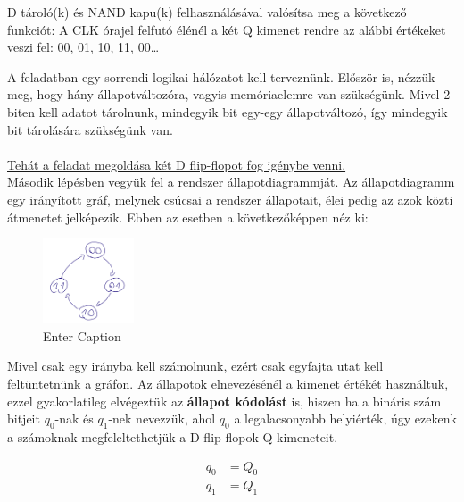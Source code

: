 \begin{example2}

D tároló(k) és NAND kapu(k) felhasználásával valósítsa meg a következő funkciót:
A CLK órajel felfutó élénél a két Q kimenet rendre az alábbi értékeket veszi fel: 00, 01, 10, 11, 00…
\end{example2}

A feladatban egy sorrendi logikai hálózatot kell terveznünk. Először is, nézzük meg, hogy hány állapotváltozóra, vagyis memóriaelemre van szükségünk. Mivel 2 biten kell adatot tárolnunk, mindegyik bit egy-egy állapotváltozó, így mindegyik bit tárolására szükségünk van. \\ \\
\underline{Tehát a feladat megoldása két D flip-flopot fog igénybe venni.} \\


Második lépésben vegyük fel a rendszer állapotdiagrammját. Az állapotdiagramm egy irányított gráf, melynek csúcsai a rendszer állapotait, élei pedig az azok közti átmenetet jelképezik. Ebben az esetben a következőképpen néz ki:

\begin{figure}{}
    \centering
    \includegraphics[width=0.24\textwidth]{Figures//tmp/sd_counter.png}
    \caption{Enter Caption}
    \label{fig:enter-label}
\end{figure}

Mivel csak egy irányba kell számolnunk, ezért csak egyfajta utat kell feltüntetnünk a gráfon. Az állapotok elnevezésénél a kimenet értékét használtuk, ezzel gyakorlatileg elvégeztük az \textbf{állapot kódolást} is, hiszen ha a bináris szám bitjeit $q_0$-nak és $q_1$-nek nevezzük, ahol $q_0$ a legalacsonyabb helyiérték, úgy ezekenk a számoknak megfeleltethetjük a D flip-flopok Q kimeneteit.

\begin{equation}
\begin{aligned}{}
    q_0 &= Q_0 \\
    q_1 &= Q_1 \\
\end{aligned}
\end{equation}

